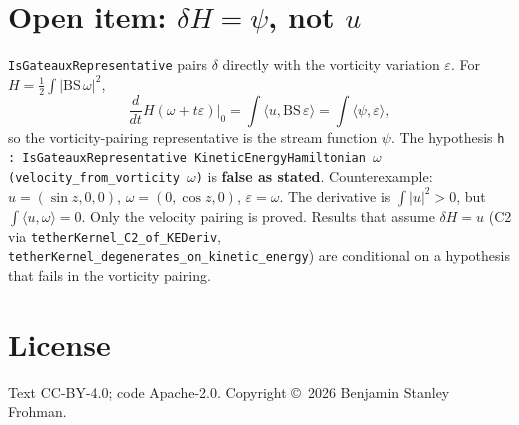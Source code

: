 \documentclass[11pt]{article}
\begin{document}
\section{Open item: $\delta H=\psi$, not $u$}
\texttt{IsGateauxRepresentative} pairs $\delta$ directly with the vorticity variation $\varepsilon$. For $H=\tfrac12\int|\mathrm{BS}\,\omega|^2$,
\[\frac{d}{dt}H(\omega+t\varepsilon)\Big|_{0}=\int\langle u,\mathrm{BS}\,\varepsilon\rangle=\int\langle\psi,\varepsilon\rangle,\]
so the vorticity-pairing representative is the stream function $\psi$. The hypothesis \texttt{h : IsGateauxRepresentative KineticEnergyHamiltonian $\omega$ (velocity\_from\_vorticity $\omega$)} is \textbf{false as stated}. Counterexample: $u=(\sin z,0,0)$, $\omega=(0,\cos z,0)$, $\varepsilon=\omega$. The derivative is $\int|u|^2>0$, but $\int\langle u,\omega\rangle=0$. Only the velocity pairing is proved. Results that assume $\delta H=u$ (C2 via \texttt{tetherKernel\_C2\_of\_KEDeriv}, \texttt{tetherKernel\_degenerates\_on\_kinetic\_energy}) are conditional on a hypothesis that fails in the vorticity pairing.

\section*{License}
Text CC-BY-4.0; code Apache-2.0. Copyright \copyright\ 2026 Benjamin Stanley Frohman.
\end{document}
